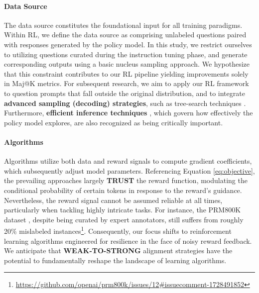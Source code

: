 \begin{itemize}[topsep=0pt]
\begin{itemize}[topsep=0pt]
\paragraph{Data Source} The data source constitutes the foundational input for all training paradigms. Within RL, we define the data source as comprising unlabeled questions paired with responses generated by the policy model. In this study, we restrict ourselves to utilizing questions curated during the instruction tuning phase, and generate corresponding outputs using a basic nucleus sampling approach. We hypothesize that this constraint contributes to our RL pipeline yielding improvements solely in Maj@K metrics. For subsequent research, we aim to apply our RL framework to question prompts that fall outside the original distribution, and to integrate \textbf{advanced sampling (decoding) strategies}, such as tree-search techniques \citep{yao2023tree}. Furthermore, \textbf{efficient inference techniques} \citep{xia-etal-2023-speculative,leviathan2023fast,kwon2023efficient,xia2024unlocking}, which govern how effectively the policy model explores, are also recognized as being critically important.

\paragraph{Algorithms} Algorithms utilize both data and reward signals to compute gradient coefficients, which subsequently adjust model parameters. Referencing Equation \ref{eq:objective}, the prevailing approaches largely \textbf{TRUST} the reward function, modulating the conditional probability of certain tokens in response to the reward's guidance. Nevertheless, the reward signal cannot be assumed reliable at all times, particularly when tackling highly intricate tasks. For instance, the PRM800K dataset \citep{lightman2023let}, despite being curated by expert annotators, still suffers from roughly 20\% mislabeled instances\footnote{\url{https://github.com/openai/prm800k/issues/12\#issuecomment-1728491852}}. Consequently, our focus shifts to reinforcement learning algorithms engineered for resilience in the face of noisy reward feedback. We anticipate that \textbf{WEAK-TO-STRONG} \citep{burns2023weak} alignment strategies have the potential to fundamentally reshape the landscape of learning algorithms.


\end{itemize}
\end{itemize}
